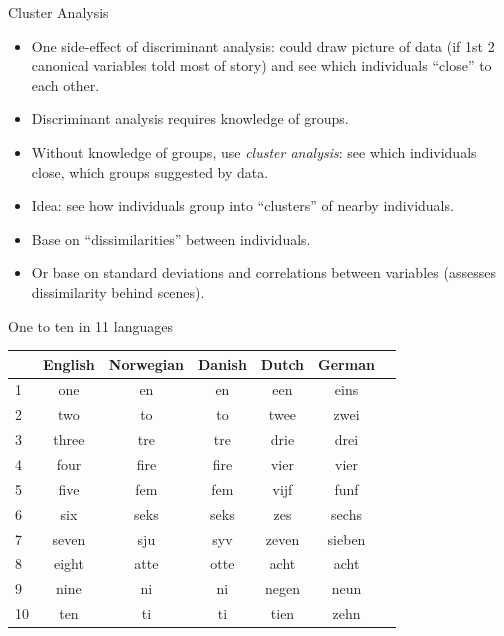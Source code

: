 \documentclass[pdf]{prosper}
\begin{document}
\begin{slide}{Cluster Analysis}

  \begin{itemize}
  \item One side-effect of discriminant analysis: could draw picture of data (if 1st 2 canonical variables told most of story) and see which individuals ``close'' to each other.
  \item Discriminant analysis requires knowledge of groups.
  \item Without knowledge of groups, use {\em cluster analysis}: see which individuals close, which groups suggested by data.
  \item Idea: see how individuals group into ``clusters'' of nearby individuals.
  \item Base on ``dissimilarities'' between individuals.
  \item Or base on standard deviations and correlations between variables (assesses dissimilarity behind scenes).
  \end{itemize}

\end{slide}

\begin{slide}{One to ten in 11 languages}

  \begin{tabular}{lcccccc}
    & English & Norwegian & Danish & Dutch & German\\
    \hline
    1 & one & en & en & een & eins\\
    2 & two & to & to & twee & zwei\\
    3 & three & tre & tre & drie & drei\\
    4 & four & fire & fire & vier & vier\\
    5 & five & fem & fem & vijf & funf\\
    6 & six & seks & seks & zes & sechs\\
    7 & seven & sju & syv & zeven & sieben\\
    8 & eight & atte & otte & acht & acht\\
    9 & nine & ni & ni & negen & neun\\
    10 & ten & ti & ti & tien & zehn\\
    \hline
    \end{tabular}
\end{slide}
\end{document}
